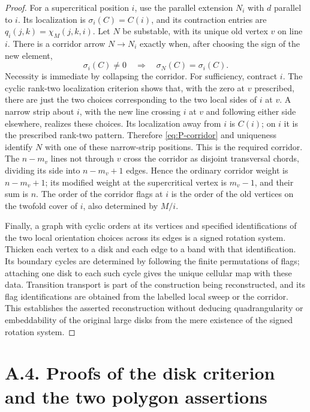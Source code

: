 \documentclass[11pt,a4paper]{article}
\begin{document}
\begin{proof}
For a supercritical position $i$, use the parallel extension
$N_i$ with $d$ parallel to $i$.  Its localization is
$\sigma_i(C)=C(i)$, and its contraction entries are
$q_i(j,k)=\chi_M(j,k,i)$.  Let $N$ be substable, with its unique old
vertex $v$ on line $i$.  There is a corridor arrow $N\to N_i$ exactly
when, after choosing the sign of the new element,
\[
          \sigma_i(C)\ne0 \quad\Longrightarrow\quad
          \sigma_N(C)=\sigma_i(C) .                     \label{eq:P-corridor}
\]
Necessity is immediate by collapsing the corridor.  For sufficiency,
contract $i$.  The cyclic rank-two localization criterion shows that,
with the zero at $v$ prescribed, there are just the two choices
corresponding to the two local sides of $i$ at $v$.  A narrow strip
about $i$, with the new line crossing $i$ at $v$ and following either
side elsewhere, realizes these choices.  Its localization away from
$i$ is $C(i)$; on $i$ it is the prescribed rank-two pattern.
Therefore \eqref{eq:P-corridor} and uniqueness identify $N$ with one
of these narrow-strip positions.  This is the required corridor.
The $n-m_v$ lines not through $v$ cross the corridor as disjoint
transversal chords, dividing its side into $n-m_v+1$ edges.  Hence
the ordinary corridor weight is $n-m_v+1$; its modified weight at
the supercritical vertex is $m_v-1$, and their sum is $n$.
The order of the corridor flags at $i$ is the order of the old
vertices on the twofold cover of $i$, also determined by $M/i$.

Finally, a graph with cyclic orders at its vertices and specified
identifications of the two local orientation choices across its edges
is a signed rotation system.  Thicken each vertex to a disk and each
edge to a band with that identification.  Its boundary cycles are
determined by following the finite permutations of flags; attaching
one disk to each such cycle gives the unique cellular map with these
data.  Transition transport is part of the construction being
reconstructed, and its flag identifications are obtained from the
labelled local sweep or the corridor.  This establishes the asserted
reconstruction without deducing quadrangularity or embeddability of
the original large disks from the mere existence of the signed
rotation system.
\end{proof}

\section{A.4. Proofs of the disk criterion and the two polygon assertions}
\label{sec:A4}
\end{document}
